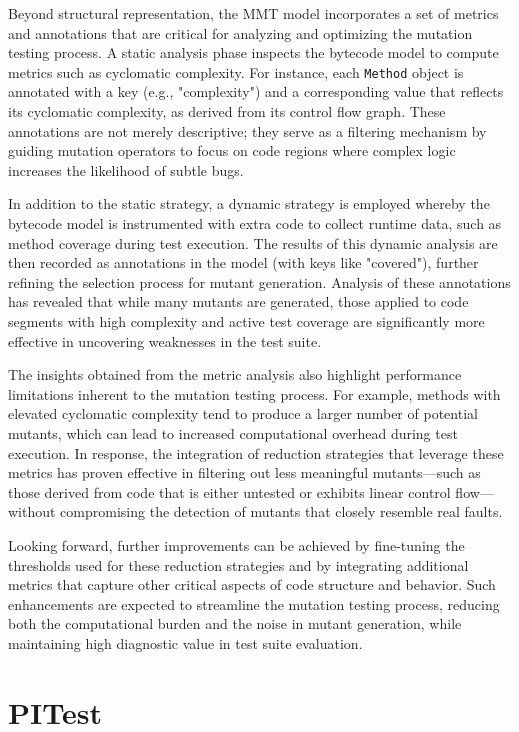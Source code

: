 \documentclass[12pt,a4paper]{article}
\begin{document}
Beyond structural representation, the MMT model incorporates a set of metrics
and annotations that are critical for analyzing and optimizing the mutation
testing process. A static analysis phase inspects the bytecode model to
compute metrics such as cyclomatic complexity. For instance, each
\texttt{Method} object is annotated with a key (e.g., "complexity") and a
corresponding value that reflects its cyclomatic complexity, as derived from
its control flow graph. These annotations are not merely descriptive; they
serve as a filtering mechanism by guiding mutation operators to focus on code
regions where complex logic increases the likelihood of subtle bugs.

In addition to the static strategy, a dynamic strategy is employed whereby the
bytecode model is instrumented with extra code to collect runtime data, such
as method coverage during test execution. The results of this dynamic
analysis are then recorded as annotations in the model (with keys like
"covered"), further refining the selection process for mutant generation.
Analysis of these annotations has revealed that while many mutants are
generated, those applied to code segments with high complexity and active
test coverage are significantly more effective in uncovering weaknesses in
the test suite.

The insights obtained from the metric analysis also highlight performance
limitations inherent to the mutation testing process. For example, methods
with elevated cyclomatic complexity tend to produce a larger number of
potential mutants, which can lead to increased computational overhead during
test execution. In response, the integration of reduction strategies that
leverage these metrics has proven effective in filtering out less meaningful
mutants—such as those derived from code that is either untested or exhibits
linear control flow—without compromising the detection of mutants that
closely resemble real faults.

Looking forward, further improvements can be achieved by fine-tuning the
thresholds used for these reduction strategies and by integrating additional
metrics that capture other critical aspects of code structure and behavior.
Such enhancements are expected to streamline the mutation testing process,
reducing both the computational burden and the noise in mutant generation,
while maintaining high diagnostic value in test suite evaluation.

\newpage
\section{PITest}
\end{document}
